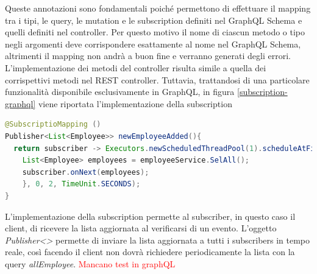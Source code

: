 Queste annotazioni sono fondamentali poiché permettono di effettuare il mapping tra i tipi, le query, le mutation e le subscription definiti nel GraphQL Schema e quelli definiti nel controller. Per questo motivo il nome di ciascun metodo o tipo negli argomenti deve corrispondere esattamente al nome nel GraphQL Schema, altrimenti il mapping non andrà a buon fine e verranno generati degli errori.\\
L'implementazione dei metodi del controller risulta simile a quella dei corrispettivi metodi nel REST controller. Tuttavia, trattandosi di una particolare funzionalità disponibile esclusivamente in GraphQL, in figura \ref{subscription-graphql} viene riportata l'implementazione della subscription \begin{lstlisting}[language=Java, morecomment={[s][\color{DarkOrchid}]{@}{\ }},  morecomment={[s][\color{OliveGreen}]{"}{"}},]
@SubscriptioMapping ()
Publisher<List<Employee>> newEmployeeAdded(){
  return subscriber -> Executors.newScheduledThreadPool(1).scheduleAtFixedRate(() -> {
    List<Employee> employees = employeeService.SelAll();
    subscriber.onNext(employees);
    }, 0, 2, TimeUnit.SECONDS);
}
\end{lstlisting}
L'implementazione della subscription permette al subscriber, in questo caso il client, di ricevere la lista aggiornata al verificarsi di un evento. L'oggetto \textit{Publisher<>} permette di inviare la lista aggiornata a tutti i subscribers in tempo reale, così facendo il client non dovrà richiedere periodicamente la lista con la query \textit{allEmployee}.
\textcolor{red}{Mancano test in graphQL}
